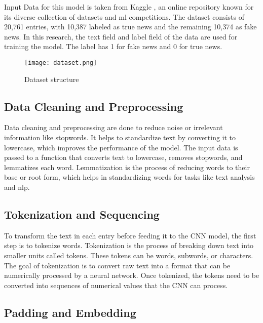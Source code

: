 Input Data for this model is taken from Kaggle \cite{fake-news-dataset}, an online repository known for its diverse collection of datasets and \ac{ml} competitions. The dataset consists of 20,761 entries, with 10,387 labeled as true news and the remaining 10,374 as fake news. In this research, the text field and label field of the data are used for training the model. The label has 1 for fake news and 0 for true news.

\begin{figure}[h]
    \centering
    \texttt{[image: dataset.png]}
    \caption{Dataset structure}
    \label{fig:Dataset structure}
\end{figure}

\subsection{Data Cleaning and Preprocessing}

Data cleaning and preprocessing are done to reduce noise or irrelevant information like stopwords. It helps to standardize text by converting it to lowercase, which improves the performance of the model. The input data is passed to a function that converts text to lowercase, removes stopwords, and lemmatizes each word. Lemmatization is the process of reducing words to their base or root form, which helps in standardizing words for tasks like text analysis and \ac{nlp}.

\subsection{Tokenization and Sequencing}

To transform the text in each entry before feeding it to the CNN model, the first step is to tokenize words. Tokenization is the process of breaking down text into smaller units called tokens. These tokens can be words, subwords, or characters. The goal of tokenization is to convert raw text into a format that can be numerically processed by a neural network. Once tokenized, the tokens need to be converted into sequences of numerical values that the CNN can process.

\subsection{Padding and Embedding}

